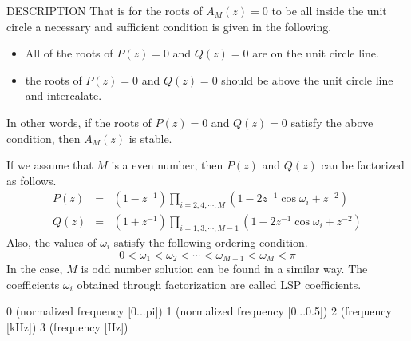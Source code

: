 \begin{qsection}{DESCRIPTION}
That is for the roots of $A_M(z)=0$ to be all inside
the unit circle a necessary and sufficient condition is given
in the following.
\begin{itemize}
\item All of the roots of $P(z)=0$ and $Q(z)=0$ are on the unit circle
      line.
\item the roots of $P(z)=0$ and $Q(z)=0$ should be above the unit
      circle line and intercalate.
\end{itemize}
In other words, if  the roots of $P(z)=0$ and $Q(z)=0$ satisfy the
above condition, then $A_M(z)$ is stable.
\par
If we assume that $M$ is a even number, then
$P(z)$ and $Q(z)$ can be factorized as follows.
\begin{eqnarray*}
  P(z) &=& ( 1 - z^{-1} ) \prod_{i=2,4,\cdots,M}
           ( 1 - 2 z^{-1} \cos \omega_i + z^{-2} ) \\
  Q(z) &=& ( 1 + z^{-1} ) \prod_{i=1,3,\cdots,M-1}
           ( 1 - 2 z^{-1} \cos \omega_i + z^{-2} )
\end{eqnarray*}
Also, the values of $\omega_i$ satisfy the following ordering condition.
\begin{displaymath}
  0 < \omega_1 < \omega_2 < \cdots < \omega_{M-1} < \omega_M < \pi
\end{displaymath}
In the case, $M$ is odd number solution can be found in a similar way.
The coefficients $\omega_i$ obtained through factorization are called
LSP coefficients.
\end{qsection}

\begin{options}
                 0 (normalized frequency [0...pi])
                 1 (normalized frequency [0...0.5])
                 2 (frequency [kHz])
                 3 (frequency [Hz])
\end{options}

